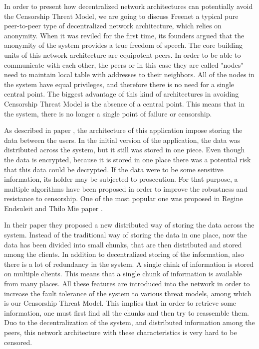 In order to present how decentralized network architectures can potentially avoid the Censorship Threat Model, we are going to discuss Freenet \cite{clarke2001} a typical pure peer-to-peer \cite{web:peertopeer} type of decentralized network architecture, which relies on anonymity. When it was reviled for the first time, its founders argued that the anonymity of the system provides a true freedom of speech. The core building units of this network architecture are equipotent peers. In order to be able to communicate with each other, the peers or in this case they are called "nodes" need to maintain local table with addresses to their neighbors. All of the nodes in the system have equal privileges, and therefore there is no need for a single central point. The biggest advantage of this kind of architectures in avoiding Censorship Threat Model is the absence of a central point. This means that in the system, there is no longer a single point of failure or censorship.  

As described in paper \cite{clarke2001}, the architecture of this application impose storing the data between the users. In the initial version of the application, the data was distributed across the system, but it still was stored in one piece. Even though the data is encrypted, because it is stored in one place there was a potential risk that this data could be decrypted. If the data were to be some sensitive information, its holder may be subjected to prosecution. For that purpose, a multiple algorithms have been proposed in order to improve the robustness and resistance to censorship. One of the most popular one was proposed in Regine Endsuleit and Thilo Mie paper \cite{endsuleit2006}. 

In their paper they proposed a new distributed way of storing the data across the system. Instead of the traditional way of storing the data in one place, now the data has been divided into small chunks, that are then distributed and stored among the clients. In addition to decentralized storing of the information, also there is a lot of redundancy in the system. A single chink of information is stored on multiple clients. This means that a single chunk of information is available from many places. All these features are introduced into the network in order to increase the fault tolerance of the system to various threat models, among which is our Censorship Threat Model. This implies that in order to retrieve some information, one must first find all the chunks and then try to reassemble them. Duo to the decentralization of the system, and distributed information among the peers, this network architecture with these characteristics is very hard to be censored.
